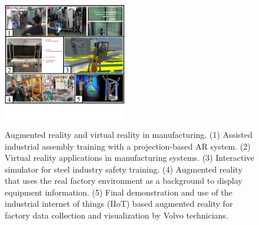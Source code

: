 \documentclass[a4paper,fleqn]{cas-dc}
\begin{document}
\begin{figure}[pos=h]
	\centering
	\includegraphics[width=0.48\textwidth]{Images/imageandvideo2.pdf}
	\vspace{-5.5em}
	\caption{Augmented reality and virtual reality in manufacturing. (1) Assisted industrial assembly training with a projection-based AR system. (2) Virtual reality applications in manufacturing systems. (3) Interactive simulator for steel industry safety training. (4) Augmented reality that uses the real factory environment as a background to display equipment information. (5) Final demonstration and use of the industrial internet of things (IIoT) based augmented reality for factory data collection and visualization by Volvo technicians.}
	\label{fig:imageandvideo2}
	\vspace{-2em}
\end{figure}

\end{document}
